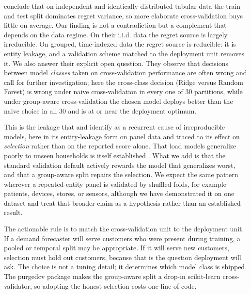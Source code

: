 \documentclass[forecasting,article,submit,oneauthor,pdftex]{Definitions/mdpi}
\newcommand{\pcv}{\textsf{purgedcv}}
\newcommand{\pkg}[1]{\textsf{#1}}
\begin{document}
\citet{teodorescu2025regret} conclude that on independent and identically
distributed tabular data the train and test split dominates regret variance, so
more elaborate cross-validation buys little on average. Our finding is not a
contradiction but a complement that depends on the data regime. On their i.i.d.
data the regret source is largely irreducible. On grouped, time-indexed data the
regret source is reducible: it is entity leakage, and a validation scheme matched
to the deployment unit removes it. We also answer their explicit open question.
They observe that decisions between model \emph{classes} taken on
cross-validation performance are often wrong and call for further investigation;
here the cross-class decision (Ridge versus Random Forest) is wrong under naive
cross-validation in every one of 30 partitions, while under group-aware
cross-validation the chosen model deploys better than the naive choice in all 30
and is at or near the deployment optimum.

This is the leakage that \citet{kapoor2023leakage} and \citet{roberts2021pitfalls}
identify as a recurrent cause of irreproducible models, here in its
entity-leakage form on panel data and traced to its effect on \emph{selection}
rather than on the reported score alone. That load models generalize poorly to
unseen households is itself established \citep{pirbazari2020generalization}. What
we add is that the standard validation default actively rewards the model that
generalizes worst, and that a group-aware split repairs the selection.
We expect the same pattern wherever a repeated-entity panel is validated by
shuffled folds, for example patients, devices, stores, or sensors, although we
have demonstrated it on one dataset and treat that broader claim as a hypothesis
rather than an established result.

The actionable rule is to match the cross-validation unit to the deployment unit.
If a demand forecaster will serve customers who were present during training, a
pooled or temporal split may be appropriate. If it will serve new customers,
selection must hold out customers, because that is the question deployment will
ask. The choice is not a tuning detail; it determines which model class is
shipped. The \pcv{} package makes the group-aware split a drop-in
\pkg{scikit-learn} cross-validator, so adopting the honest selection costs one
line of code.
\end{document}
